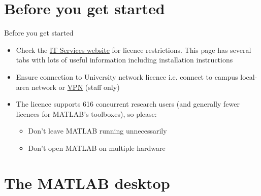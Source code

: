 \documentclass{beamer}
\begin{document}
\section{Before you get started}
\begin{frame}{Before you get started}
	\begin{itemize}
		\item Check the \href{https://www.applications.itservices.manchester.ac.uk/show_product.php?id=98&tab=licensing}{IT Services website} for licence restrictions. This page has several tabs with lots of useful information including installation instructions
		\item Ensure connection to University network licence i.e. connect to campus local-area network or \href{http://www.itservices.manchester.ac.uk/our-services/my-it/vpn/}{VPN} (staff only)
		\item The licence supports 616 concurrent research users (and generally fewer licences for MATLAB's toolboxes), so please:
		\begin{itemize}
			\item Don't leave MATLAB running unnecessarily
			\item Don't open MATLAB on multiple hardware
		\end{itemize}
	\end{itemize}
\end{frame}

\section{The MATLAB desktop}
\end{document}
